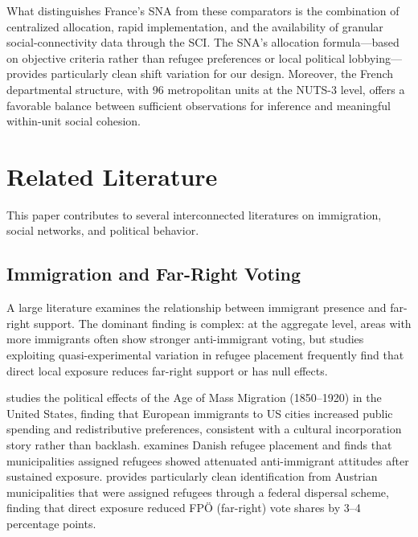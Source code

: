 \documentclass[12pt]{article}
\begin{document}
What distinguishes France's SNA from these comparators is the combination of centralized allocation, rapid implementation, and the availability of granular social-connectivity data through the SCI. The SNA's allocation formula---based on objective criteria rather than refugee preferences or local political lobbying---provides particularly clean shift variation for our design. Moreover, the French departmental structure, with 96 metropolitan units at the NUTS-3 level, offers a favorable balance between sufficient observations for inference and meaningful within-unit social cohesion.

\section{Related Literature}
\label{sec:literature}

This paper contributes to several interconnected literatures on immigration, social networks, and political behavior.

\subsection{Immigration and Far-Right Voting}

A large literature examines the relationship between immigrant presence and far-right support. The dominant finding is complex: at the aggregate level, areas with more immigrants often show stronger anti-immigrant voting, but studies exploiting quasi-experimental variation in refugee placement frequently find that direct local exposure reduces far-right support or has null effects.

\citet{tabellini2020gifts} studies the political effects of the Age of Mass Migration (1850--1920) in the United States, finding that European immigrants to US cities increased public spending and redistributive preferences, consistent with a cultural incorporation story rather than backlash. \citet{dustmann2019refugee} examines Danish refugee placement and finds that municipalities assigned refugees showed attenuated anti-immigrant attitudes after sustained exposure. \citet{steinmayr2021contact} provides particularly clean identification from Austrian municipalities that were assigned refugees through a federal dispersal scheme, finding that direct exposure reduced FP\"O (far-right) vote shares by 3--4 percentage points.
\end{document}
